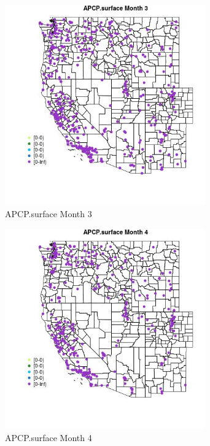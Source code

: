 \begin{figure} 
\centering  
\includegraphics[width=0.77\textwidth]{Code_Outputs/Report_ML_input_PM25_Step4_part_e_de_duplicated_aves_compiled_2019-05-18wNAs_MapObsMo3APCPsurface.jpg} 
\caption{\label{fig:Report_ML_input_PM25_Step4_part_e_de_duplicated_aves_compiled_2019-05-18wNAsMapObsMo3APCPsurface}APCP.surface Month 3} 
\end{figure} 
 

\begin{figure} 
\centering  
\includegraphics[width=0.77\textwidth]{Code_Outputs/Report_ML_input_PM25_Step4_part_e_de_duplicated_aves_compiled_2019-05-18wNAs_MapObsMo4APCPsurface.jpg} 
\caption{\label{fig:Report_ML_input_PM25_Step4_part_e_de_duplicated_aves_compiled_2019-05-18wNAsMapObsMo4APCPsurface}APCP.surface Month 4} 
\end{figure} 
 

